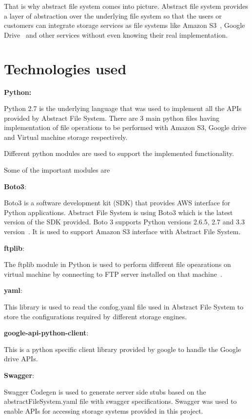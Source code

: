 That is why abstract file system comes into picture. Abstract file system
provides a layer of abstraction over the underlying file system so that the
users or customers can integrate storage services as file systems like 
Amazon S3~\cite{hid-sp18-420-amazon-S3}, 
Google Drive~\cite{hid-sp18-420-google-drive} and other services 
without even knowing their real implementation.


\section{Technologies used}
\textbf{Python:}

Python 2.7 is the underlying language that was used to implement all the APIs 
provided by Abstract File System.  There are 3 main python files having 
implementation of file operations to be performed with Amazon S3, Google drive 
and Virtual machine storage respectively. 


Different python modules are used to support the implemented functionality.


Some of the important modules are 

\begin{description}
\item \textbf{Boto3}: 

Boto3 is a software development kit (SDK) that provides AWS interface for 
Python applications. Abstract File System is using Boto3 which is the latest 
version of the SDK provided. Boto 3 supports Python versions 2.6.5, 2.7 and 
3.3 version~\cite{hid-sp18-420-boto}. 
It is used to support Amazon S3 interface with Abstract File System.

\item \textbf{ftplib}:

The ftplib module in Python is used to perform different file opearations on 
virtual machine by connecting to FTP server installed on that 
machine~\cite{hid-sp18-420-FTP}.

\item \textbf{yaml}:

This library is used to read the confog.yaml file used in Abstract File System 
to store the configurations required by different storage engines.


\item \item \textbf{google-api-python-client}:

This is a python specific client library provided by google to handle the 
Google drive APIs.



\item \textbf{Swagger}:

Swagger Codegen is used to generate server side stubs based on the 
abstractFileSystem.yaml file with swagger specifications. Swagger was used to 
enable APIs for accessing storage systems provided in this project.

\end{description}




